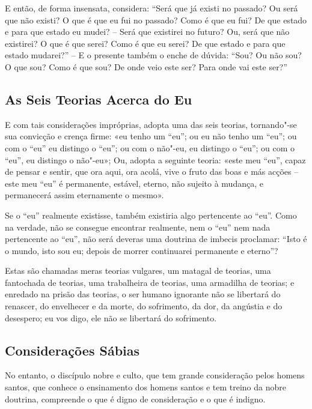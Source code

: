 E então, de forma insensata, considera: “Será que já existi no passado? Ou será
que não existi? O que é que eu fui no passado? Como é que eu fui? De que estado
e para que estado eu mudei? -- Será que existirei no futuro? Ou, será que não
existirei? O que é que serei? Como é que eu serei? De que estado e para que
estado mudarei?” -- E o presente também o enche de dúvida: “Sou? Ou não sou? O
que sou? Como é que sou? De onde veio este ser? Para onde vai este ser?”

\subsection{As Seis Teorias Acerca do Eu}

E com tais considerações impróprias, adopta uma das seis teorias, tornando"-se
sua convicção e crença firme: «eu tenho um “eu”; ou eu não tenho um “eu”;
ou com o “eu” eu distingo o “eu”; ou com o não"-eu, eu distingo o “eu”;
ou com o “eu”, eu distingo o não"-eu»; Ou, adopta a seguinte teoria: «este meu
“eu”, capaz de pensar e sentir, que ora aqui, ora acolá, vive o fruto das boas
e más acções -- este meu “eu” é permanente, estável, eterno, não sujeito à
mudança, e permanecerá assim eternamente o mesmo».


Se o “eu” realmente existisse, também existiria algo pertencente ao “eu”.
Como na verdade, não se consegue encontrar realmente, nem o “eu” nem nada
pertencente ao “eu”, não será deveras uma doutrina de imbecis proclamar:
“Isto é o mundo, isto sou eu; depois de morrer continuarei permanente e
eterno”?


Estas são chamadas meras teorias vulgares, um matagal de teorias, uma fantochada
de teorias, uma trabalheira de teorias, uma armadilha de teorias; e enredado na
prisão das teorias, o ser humano ignorante não se libertará do renascer, do
envelhecer e da morte, do sofrimento, da dor, da angústia e do desespero; eu
vos digo, ele não se libertará do sofrimento.

\clearpage

\subsection{Considerações Sábias}

No entanto, o discípulo nobre e culto, que tem grande consideração pelos homens
santos, que conhece o ensinamento dos homens santos e tem treino da nobre
doutrina, compreende o que é digno de consideração e o que é indigno.

